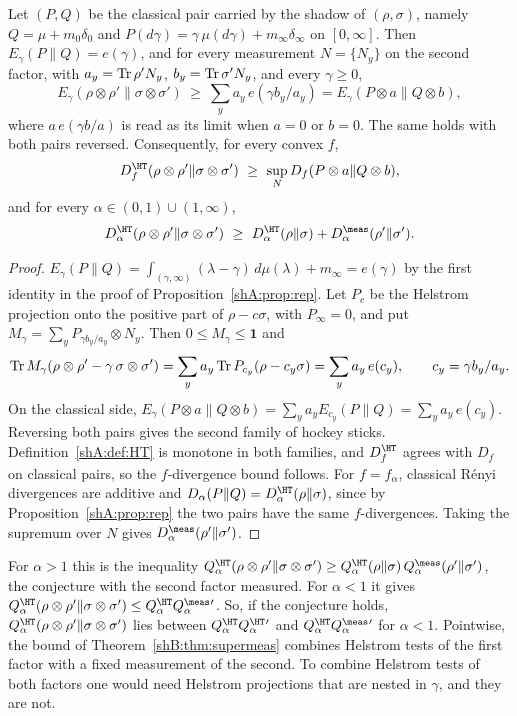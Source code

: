 \begin{theorem}\label{shB:thm:supermeas}
Let $(P,Q)$ be the classical pair carried by the shadow of $(\rho,\sigma)$, namely $Q=\mu+m_0\delta_0$ and $P(d\gamma)=\gamma\,\mu(d\gamma)+m_\infty\delta_\infty$ on $[0,\infty]$. Then $E_\gamma(P\|Q)=e(\gamma)$, and for every measurement $N=\{N_y\}$ on the second factor, with $a_y=\operatorname{Tr}\rho'N_y$, $b_y=\operatorname{Tr}\sigma'N_y$, and every $\gamma\ge0$,
\[
E_\gamma(\rho\otimes\rho'\|\sigma\otimes\sigma')\ \ge\ \sum_ya_y\,e(\gamma b_y/a_y)=E_\gamma(P\otimes a\|Q\otimes b),
\]
where $a\,e(\gamma b/a)$ is read as its limit when $a=0$ or $b=0$. The same holds with both pairs reversed. Consequently, for every convex $f$,
\[
D^\HT_f(\rho\otimes\rho'\|\sigma\otimes\sigma')\ \ge\ \sup_ND_f(P\otimes a\|Q\otimes b),
\]
and for every $\alpha\in(0,1)\cup(1,\infty)$,
\[
D^\HT_\alpha(\rho\otimes\rho'\|\sigma\otimes\sigma')\ \ge\ D^\HT_\alpha(\rho\|\sigma)+D^\meas_\alpha(\rho'\|\sigma') .
\]
\end{theorem}

\begin{proof}
$E_\gamma(P\|Q)=\int_{(\gamma,\infty)}(\lambda-\gamma)\,d\mu(\lambda)+m_\infty=e(\gamma)$ by the first identity in the proof of Proposition~\ref{shA:prop:rep}. Let $P_c$ be the Helstrom projection onto the positive part of $\rho-c\sigma$, with $P_\infty=0$, and put $M_\gamma=\sum_yP_{\gamma b_y/a_y}\otimes N_y$. Then $0\le M_\gamma\le\mathbf 1$ and
\[
\operatorname{Tr} M_\gamma(\rho\otimes\rho'-\gamma\,\sigma\otimes\sigma')=\sum_ya_y\operatorname{Tr} P_{c_y}(\rho-c_y\sigma)=\sum_ya_y\,e(c_y),\qquad c_y=\gamma b_y/a_y .
\]
On the classical side, $E_\gamma(P\otimes a\|Q\otimes b)=\sum_ya_yE_{c_y}(P\|Q)=\sum_ya_y\,e(c_y)$. Reversing both pairs gives the second family of hockey sticks. Definition~\ref{shA:def:HT} is monotone in both families, and $D^\HT_f$ agrees with $D_f$ on classical pairs, so the $f$-divergence bound follows. For $f=f_\alpha$, classical R\'enyi divergences are additive and $D_\alpha(P\|Q)=D^\HT_\alpha(\rho\|\sigma)$, since by Proposition~\ref{shA:prop:rep} the two pairs have the same $f$-divergences. Taking the supremum over $N$ gives $D^\meas_\alpha(\rho'\|\sigma')$.
\end{proof}

For $\alpha>1$ this is the inequality $Q^\HT_\alpha(\rho\otimes\rho'\|\sigma\otimes\sigma')\ge Q^\HT_\alpha(\rho\|\sigma)\,Q^\meas_\alpha(\rho'\|\sigma')$, the conjecture with the second factor measured. For $\alpha<1$ it gives $Q^\HT_\alpha(\rho\otimes\rho'\|\sigma\otimes\sigma')\le Q^\HT_\alpha Q^\meas_\alpha{}'$. So, if the conjecture holds, $Q^\HT_\alpha(\rho\otimes\rho'\|\sigma\otimes\sigma')$ lies between $Q^\HT_\alpha Q^\HT_\alpha{}'$ and $Q^\HT_\alpha Q^\meas_\alpha{}'$ for $\alpha<1$. Pointwise, the bound of Theorem~\ref{shB:thm:supermeas} combines Helstrom tests of the first factor with a fixed measurement of the second. To combine Helstrom tests of both factors one would need Helstrom projections that are nested in $\gamma$, and they are not.

